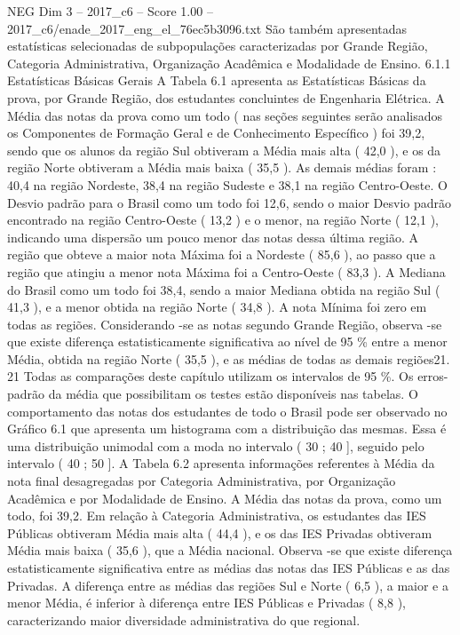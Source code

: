 \begin{textsample}{NEG Dim 3 – 2017\_c6 – Score 1.00 – 2017\_c6/enade\_2017\_eng\_el\_76ec5b3096.txt}
São também apresentadas estatísticas selecionadas de subpopulações caracterizadas por Grande Região, Categoria Administrativa, Organização Acadêmica e Modalidade de Ensino. 6.1.1 Estatísticas Básicas Gerais A Tabela 6.1 apresenta as Estatísticas Básicas da prova, por Grande Região, dos estudantes concluintes de Engenharia Elétrica.
A Média das notas da prova como um todo ( nas seções seguintes serão analisados os Componentes de Formação Geral e de Conhecimento Específico ) foi 39,2, sendo que os alunos da região Sul obtiveram a Média mais alta ( 42,0 ), e os da região Norte obtiveram a Média mais baixa ( 35,5 ).
As demais médias foram : 40,4 na região Nordeste, 38,4 na região Sudeste e 38,1 na região Centro-Oeste.
O Desvio padrão para o Brasil como um todo foi 12,6, sendo o maior Desvio padrão encontrado na região Centro-Oeste ( 13,2 ) e o menor, na região Norte ( 12,1 ), indicando uma dispersão um pouco menor das notas dessa última região.
A região que obteve a maior nota Máxima foi a Nordeste ( 85,6 ), ao passo que a região que atingiu a menor nota Máxima foi a Centro-Oeste ( 83,3 ).
A Mediana do Brasil como um todo foi 38,4, sendo a maior Mediana obtida na região Sul ( 41,3 ), e a menor obtida na região Norte ( 34,8 ).
A nota Mínima foi zero em todas as regiões.
Considerando -se as notas segundo Grande Região, observa -se que existe diferença estatisticamente significativa ao nível de 95 \% entre a menor Média, obtida na região Norte ( 35,5 ), e as médias de todas as demais regiões21. 21 Todas as comparações deste capítulo utilizam os intervalos de 95 \%.
Os erros-padrão da média que possibilitam os testes estão disponíveis nas tabelas.
O comportamento das notas dos estudantes de todo o Brasil pode ser observado no Gráfico 6.1 que apresenta um histograma com a distribuição das mesmas.
Essa é uma distribuição unimodal com a moda no intervalo ( 30 ; 40 ], seguido pelo intervalo ( 40 ; 50 ].
A Tabela 6.2 apresenta informações referentes à Média da nota final desagregadas por Categoria Administrativa, por Organização Acadêmica e por Modalidade de Ensino.
A Média das notas da prova, como um todo, foi 39,2.
Em relação à Categoria Administrativa, os estudantes das IES Públicas obtiveram Média mais alta ( 44,4 ), e os das IES Privadas obtiveram Média mais baixa ( 35,6 ), que a Média nacional.
Observa -se que existe diferença estatisticamente significativa entre as médias das notas das IES Públicas e as das Privadas.
A diferença entre as médias das regiões Sul e Norte ( 6,5 ), a maior e a menor Média, é inferior à diferença entre IES Públicas e Privadas ( 8,8 ), caracterizando maior diversidade administrativa do que regional.

\end{textsample}
